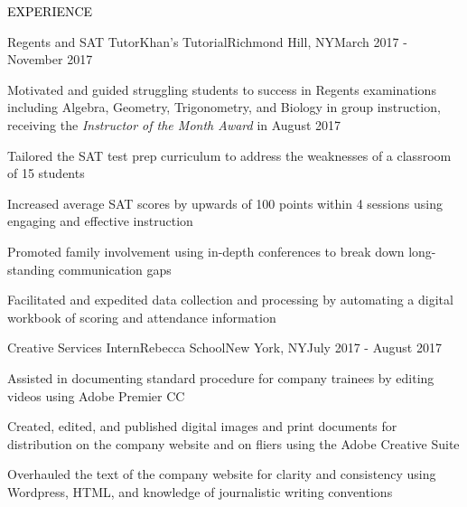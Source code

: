 \documentclass{resume} %
\renewenvironment{rSection}[1]{
  \sectionskip
  \textcolor{Black}{\MakeUppercase{#1}}
  \sectionlineskip
  \begin{list}{}{
      \setlength{\leftmargin}{1.5em}
    }
  \item[]
}{
  \end{list}
}
\begin{document}
\begin{rSection}{Experience}

  \begin{rSubsection}{Regents and SAT Tutor}{Khan's Tutorial}{Richmond Hill, NY}{March 2017 - November 2017}
  \item Motivated and guided struggling students to success in Regents
    examinations including Algebra, Geometry, Trigonometry, and Biology in group
    instruction, receiving the {\em Instructor of the Month Award} in August
    2017
  \item Tailored the SAT test prep curriculum to address the weaknesses of a
    classroom of 15 students
  \item Increased average SAT scores by upwards of 100 points within 4 sessions
    using engaging and effective instruction
  \item Promoted family involvement using in-depth conferences to break down
    long-standing communication gaps
  \item Facilitated and expedited data collection and processing by automating a
    digital workbook of scoring and attendance information
  \end{rSubsection}

  \begin{rSubsection}{Creative Services Intern}{Rebecca School}{New York, NY}{July 2017 - August 2017}
  \item Assisted in documenting standard procedure for company trainees by
    editing videos using Adobe Premier CC
  \item Created, edited, and published digital images and print documents for
    distribution on the company website and on fliers using the Adobe Creative
    Suite
  \item Overhauled the text of the company website for clarity and consistency
    using Wordpress, HTML, and knowledge of journalistic writing conventions
  \end{rSubsection}


\end{rSection}
\end{document}
